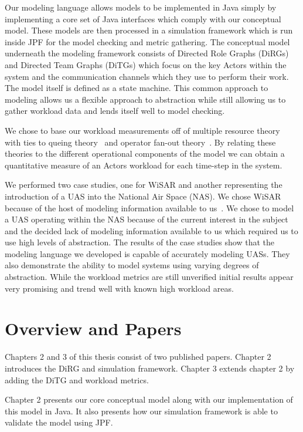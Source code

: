 Our modeling language allows models to be implemented in Java simply by implementing a core set of Java interfaces which comply with our conceptual model.  These models are then processed in a simulation framework which is run inside JPF for the model checking and metric gathering.  The conceptual model underneath the modeling framework consists of Directed Role Graphs (DiRGs) and Directed Team Graphs (DiTGs) which focus on the key Actors within the system and the communication channels which they use to perform their work.  The model itself is defined as a state machine.  This common approach to modeling allows us a flexible approach to abstraction while still allowing us to gather workload data and lends itself well to model checking.

We chose to base our workload measurements off of multiple resource theory~\cite{wickens} with ties to queing theory~\cite{queuetheory} and operator fan-out theory~\cite{}.  By relating these theories to the different operational components of the model we can obtain a quantitative measure of an Actors workload for each time-step in the system.

We performed two case studies, one for WiSAR and another representing the introduction of a UAS into the National Air Space (NAS).  We chose WiSAR because of the host of modeling information available to us~\cite{Adams2008}.  We chose to model a UAS operating within the NAS because of the current interest in the subject~\cite{UASinNAS} and the decided lack of modeling information available to us which required us to use high levels of abstraction.  The results of the case studies show that the modeling language we developed is capable of accurately modeling UASs.  They also demonstrate the ability to model systems using varying degrees of abstraction.  While the workload metrics are still unverified initial results appear very promising and trend well with known high workload areas.


\section{Overview and Papers}
Chapters 2 and 3 of this thesis consist of two published papers.  Chapter 2 introduces the DiRG and simulation framework.  Chapter 3 extends chapter 2 by adding the DiTG and workload metrics.

Chapter 2 presents our core conceptual model along with our implementation of this model in Java.  It also presents how our simulation framework is able to validate the model using JPF.

